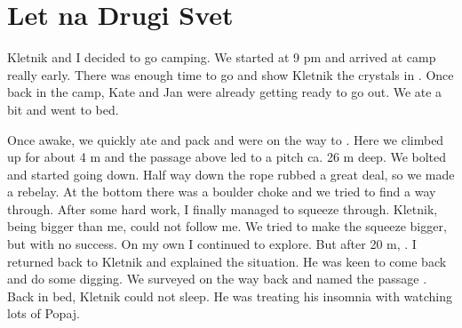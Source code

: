 \section{Let na Drugi Svet}


Kletnik and I decided to go camping. We started at 9 pm and arrived at
camp  really early. There was enough time to go and show
Kletnik the crystals in . Once back in the
camp, Kate and Jan were already getting ready to go out. We ate a bit
and went to bed.

Once awake, we quickly ate and pack and were on the way to
. Here we climbed up for about 4 m and the passage
above led to a pitch ca. 26 m deep. We bolted and started going down.
Half way down the rope rubbed a great deal, so we made a rebelay. At the
bottom there was a boulder choke and we tried to find a way through.
After some hard work, I finally managed to squeeze through. Kletnik,
being bigger than me, could not follow me. We tried to make the squeeze
bigger, but with no success. On my own I continued to explore. But after
20 m, . I returned back to Kletnik and explained the situation. He
was keen to come back and do some digging. We surveyed on the way back
and named the passage . Back in bed, Kletnik
could not sleep. He was treating his insomnia with watching lots of
Popaj.


